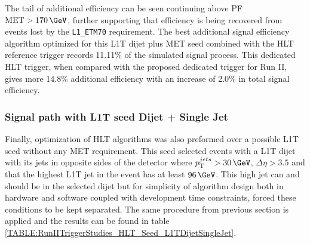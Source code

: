 The tail of additional efficiency can be seen continuing above \gls{PF} $\text{MET}>170\,\GeV$, further supporting that efficiency is being recovered from events lost by the \verb|L1_ETM70| requirement. The best additional signal efficiency algorithm optimized for this \gls{L1T} dijet plus \gls{MET} seed combined with the \gls{HLT} reference trigger records 11.11\% of the simulated signal process. This dedicated \gls{HLT} trigger, when compared with the proposed dedicated trigger for Run II, gives more 14.8\% additional efficiency with an increase of 2.0\% in total signal efficiency.

\subsubsection{Signal path with L1T seed Dijet + Single Jet}
\label{SECTION:RunIITriggerStudies_HLTAlgorithmDevelopment_L1TDijetSingleJet}


Finally, optimization of \gls{HLT} algorithms was also preformed over a possible \gls{L1T} seed without any \gls{MET} requirement. This seed selected events with a \gls{L1T} dijet with its jets in opposite sides of the detector where $\pt^{jets}>30\,\GeV$, $\Delta\eta>3.5$ and that the highest \pt \gls{L1T} jet in the event has at least $96\,\GeV$. This high \pt jet can and should be in the selected dijet but for simplicity of algorithm design both in hardware and software coupled with development time constraints, forced these conditions to be kept separated. The same procedure from previous section is applied and the results can be found in table \ref{TABLE:RunIITriggerStudies_HLT_Seed_L1TDijetSingleJet}.

